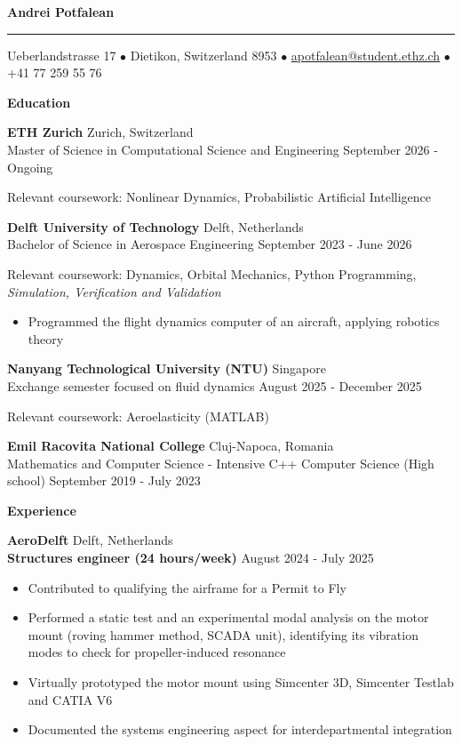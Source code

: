 \documentclass[11pt]{article}
\newcommand{\cvsection}[1]{%
  \vspace{16pt}%
  \centerline{\textbf{#1}}%
  \vspace{8pt}%
}
\newcommand{\cventry}[4]{%
  \textbf{#1} \hfill #2 \\
  #3 \hfill #4\par
}
\newcommand{\cvrole}[4]{%
  \textbf{#1} \hfill #2 \\
  \textbf{#3} \hfill #4\par
}
\newcommand{\cvgap}{\vspace{0.7em}}
\begin{document}
\begin{center}
  {\LARGE\textbf{Andrei Potfalean}}
\end{center}
\vspace{0.8pt}
\hrule
\vspace{18pt}
\centerline{Ueberlandstrasse 17 $\bullet$ Dietikon, Switzerland 8953 $\bullet$
  \href{mailto:apotfalean@student.ethz.ch}{apotfalean@student.ethz.ch} $\bullet$ +41 77 259 55 76}

\cvsection{Education}

\cventry{ETH Zurich}{Zurich, Switzerland}
  {Master of Science in Computational Science and Engineering}{September 2026 - Ongoing}
Relevant coursework: Nonlinear Dynamics, Probabilistic Artificial Intelligence
\cvgap

\cventry{Delft University of Technology}{Delft, Netherlands}
  {Bachelor of Science in Aerospace Engineering}{September 2023 - June 2026}
Relevant coursework: Dynamics, Orbital Mechanics, Python Programming, \textit{Simulation, Verification and Validation}
\begin{itemize}
  \item Programmed the flight dynamics computer of an aircraft, applying robotics theory
\end{itemize}
\cvgap

\cventry{Nanyang Technological University (NTU)}{Singapore}
  {Exchange semester focused on fluid dynamics}{August 2025 - December 2025}
Relevant coursework: Aeroelasticity (MATLAB)
\cvgap

\cventry{Emil Racovita National College}{Cluj-Napoca, Romania}
  {Mathematics and Computer Science - Intensive C++ Computer Science (High school)}{September 2019 - July 2023}

\cvsection{Experience}

\cvrole{AeroDelft}{Delft, Netherlands}{Structures engineer (24 hours/week)}{August 2024 - July 2025}
\begin{itemize}
  \item Contributed to qualifying the airframe for a Permit to Fly
  \item Performed a static test and an experimental modal analysis on the motor mount (roving hammer method, SCADA unit), identifying its vibration modes to check for propeller-induced resonance
  \item Virtually prototyped the motor mount using Simcenter 3D, Simcenter Testlab and CATIA V6
  \item Documented the systems engineering aspect for interdepartmental integration
\end{itemize}
\cvgap
\end{document}
